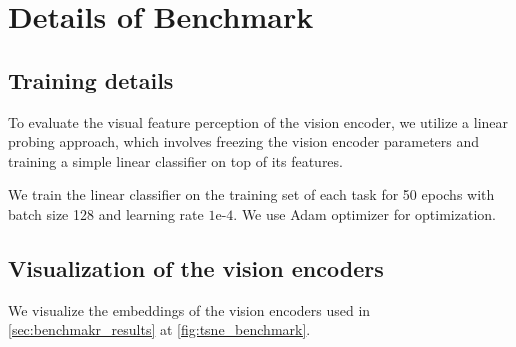 \section{Details of Benchmark}

\subsection{Training details}

\label{sec:hparams}

To evaluate the visual feature perception of the vision encoder, we utilize a linear probing approach, which involves freezing the vision
encoder parameters and training a simple linear classifier on top of its features.

We train the linear classifier on the training set of each task for 50 epochs with batch size 128 and learning rate $1\text{e-}4$.
We use Adam optimizer for optimization.

\subsection{Visualization of the vision encoders}

We visualize the embeddings of the vision encoders used in \cref{sec:benchmakr_results} at \cref{fig:tsne_benchmark}.




